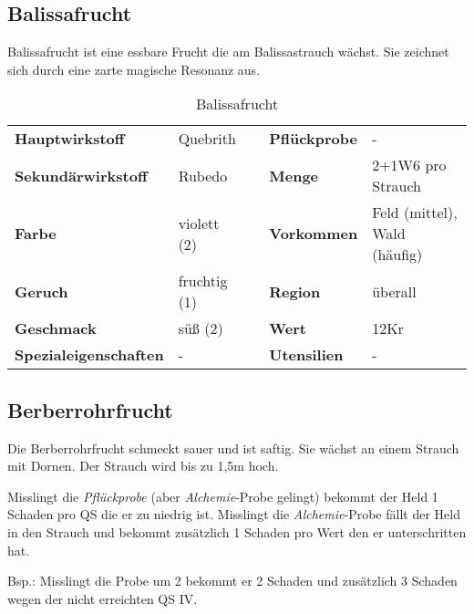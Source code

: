 \subsection{Balissafrucht}
Balissafrucht ist eine essbare Frucht die am Balissastrauch wächst. Sie zeichnet sich durch eine zarte magische Resonanz aus. 
\newpage
\begin{table}[h]
\begin{center}
\begin{tabular}{|l|l|p{1cm}|l|l|}
	\cline{1-2} \cline{4-5}
	\textbf{Hauptwirkstoff} & Quebrith && \textbf{Pflückprobe} & - \\ \cline{1-2} \cline{4-5}
	\textbf{Sekundärwirkstoff} & Rubedo && \textbf{Menge} & 2+1W6 pro Strauch \\ \cline{1-2} \cline{4-5}
	\textbf{Farbe} & violett (2) && \textbf{Vorkommen} & Feld (mittel), Wald (häufig) \\ \cline{1-2} \cline{4-5}
	\textbf{Geruch} & fruchtig (1) && \textbf{Region} & überall \\ \cline{1-2} \cline{4-5}
	\textbf{Geschmack} & süß (2) && \textbf{Wert} & 12Kr \\ \cline{1-2} \cline{4-5}
	\textbf{Spezialeigenschaften} & - && \textbf{Utensilien} & - \\ \cline{1-2} \cline{4-5}
\end{tabular}
\end{center}
\caption{Balissafrucht}
\label{tab:balissafrucht}
\end{table}


\subsection{Berberrohrfrucht}
Die Berberrohrfrucht schmeckt sauer und ist saftig. Sie wächst an einem Strauch mit Dornen. Der Strauch wird bis zu 1,5m hoch. 

Misslingt die \textit{Pflückprobe} (aber \textit{Alchemie}-Probe gelingt) bekommt der Held 1 Schaden pro QS die er zu niedrig ist. Misslingt die \textit{Alchemie}-Probe fällt der Held in den Strauch und bekommt zusätzlich 1 Schaden pro Wert den er unterschritten hat. 

Bsp.: Misslingt die Probe um 2 bekommt er 2 Schaden und zusätzlich 3 Schaden wegen der nicht erreichten QS IV.

